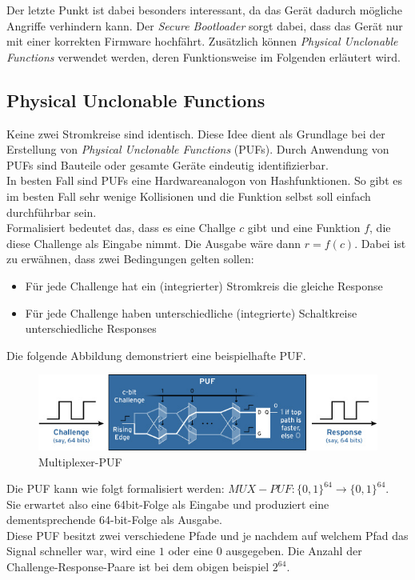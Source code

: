 \documentclass[conference]{IEEEtran}
\begin{document}
Der letzte Punkt ist dabei besonders interessant, da das Gerät dadurch mögliche Angriffe verhindern kann. Der \textit{Secure Bootloader} sorgt dabei, dass das Gerät nur mit einer korrekten Firmware hochfährt. Zusätzlich können \textit{Physical Unclonable Functions} verwendet werden, deren Funktionsweise im Folgenden erläutert wird.

\subsection{Physical Unclonable Functions}
Keine zwei Stromkreise sind identisch. Diese Idee dient als Grundlage bei der Erstellung von \textit{Physical Unclonable Functions} (PUFs). Durch Anwendung von PUFs sind Bauteile oder gesamte Geräte eindeutig identifizierbar.\\
In besten Fall sind PUFs eine Hardwareanalogon von Hashfunktionen. So gibt es im besten Fall sehr wenige Kollisionen und die Funktion selbst soll einfach durchführbar sein.\\
Formalisiert bedeutet das, dass es eine Challge $c$ gibt und eine Funktion $f$, die diese Challenge als Eingabe nimmt. Die Ausgabe wäre dann $r = f(c)$. 
Dabei ist zu erwähnen, dass zwei Bedingungen gelten sollen:
\begin{itemize}
  \item Für jede Challenge hat ein (integrierter) Stromkreis die gleiche Response
  \item Für jede Challenge haben unterschiedliche (integrierte) Schaltkreise unterschiedliche Responses 
\end{itemize}

Die folgende Abbildung demonstriert eine beispielhafte PUF. 

\begin{figure}[h]
\centering
  \includegraphics[width=\columnwidth]{puf}
  \caption{Multiplexer-PUF}
  \label{fig:puf}
\end{figure}

Die PUF kann wie folgt formalisiert werden: $MUX-PUF: \{0,1\}^{64} \rightarrow \{0,1\}^{64}$. \\
Sie erwartet also eine 64bit-Folge als Eingabe und produziert eine dementsprechende 64-bit-Folge als Ausgabe.\\
Diese PUF besitzt zwei verschiedene Pfade und je nachdem auf welchem Pfad das Signal schneller war, wird eine $1$ oder eine $0$ ausgegeben. Die Anzahl der Challenge-Response-Paare ist bei dem obigen beispiel $2^{64}$\cite{webpufs}.\\
\end{document}
